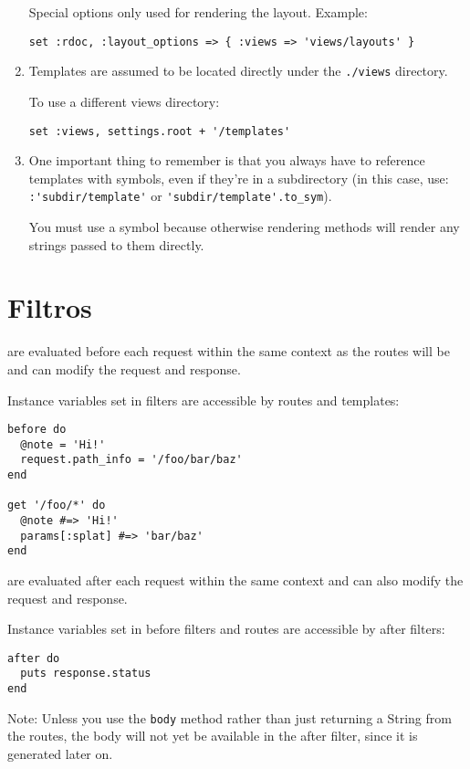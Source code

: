 \begin{enumerate}
Special options only used for rendering the layout. Example: 

\begin{verbatim}
set :rdoc, :layout_options => { :views => 'views/layouts' }
\end{verbatim}

\item 
Templates are assumed to be located directly under the \verb|./views| directory. 

To use a different views directory: 

\begin{verbatim}
set :views, settings.root + '/templates'
\end{verbatim}

\item 
One important thing to remember is that you always have to reference
templates with symbols, even if they’re in a subdirectory (in this
case, use: 
\verb|:'subdir/template'| 
or 
\verb|'subdir/template'.to_sym|). 

You
must use a symbol because otherwise rendering methods will render
any strings passed to them directly.
\end{enumerate}

\section{Filtros}

 are evaluated before each request within the
same context as the routes will be and can modify the request and
response. 

Instance variables set in filters are accessible by routes
and templates:

\begin{verbatim}
before do
  @note = 'Hi!'
  request.path_info = '/foo/bar/baz'
end

get '/foo/*' do
  @note #=> 'Hi!'
  params[:splat] #=> 'bar/baz'
end
\end{verbatim}

 are evaluated after each request within the same
context and can also modify the request and response. 

Instance
variables set in before filters and routes are accessible by after
filters:

\begin{verbatim}
after do
  puts response.status
end
\end{verbatim}
Note: Unless you use the \verb|body| method rather than just returning a
String from the routes, the body will not yet be available in the
after filter, since it is generated later on.

